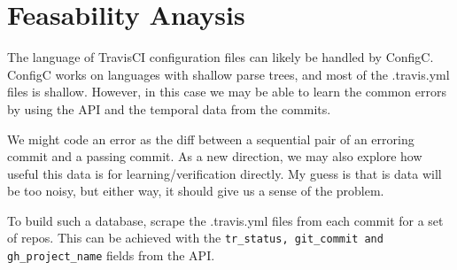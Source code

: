 
\section{Feasability Anaysis}
\label{sec:feas}

The language of TravisCI configuration files can likely be handled by ConfigC.
ConfigC works on languages with shallow parse trees, and most of the .travis.yml files is shallow.
However, in this case we may be able to learn the common errors by using the API and the temporal data from the commits.

We might code an error as the diff between a sequential pair of an erroring commit and a passing commit.
As a new direction, we may also explore how useful this data is for learning/verification directly.
My guess is that is data will be too noisy, but either way, it should give us a sense of the problem.

To build such a database, scrape the .travis.yml files from each commit for a set of repos.
This can be achieved with the \verb|tr_status, git_commit and gh_project_name| fields from the API.
